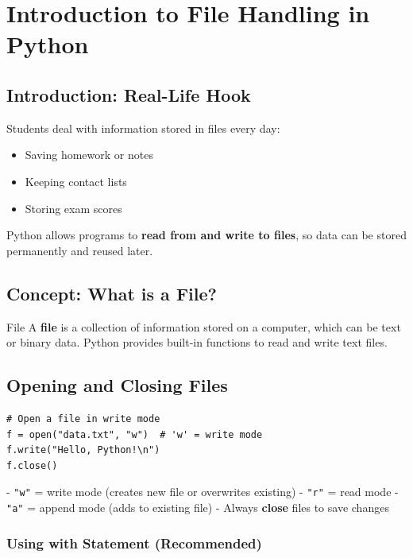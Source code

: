 \chapter{Introduction to File Handling in Python}

\section{Introduction: Real-Life Hook}

Students deal with information stored in files every day:  

\begin{itemize}
    \item Saving homework or notes  
    \item Keeping contact lists  
    \item Storing exam scores  
\end{itemize}

Python allows programs to \textbf{read from and write to files}, so data can be stored permanently and reused later.

\section{Concept: What is a File?}

\begin{definition}{File}
A \textbf{file} is a collection of information stored on a computer, which can be text or binary data.  
Python provides built-in functions to read and write text files.
\end{definition}

\section{Opening and Closing Files}

\begin{verbatim}
# Open a file in write mode
f = open("data.txt", "w")  # 'w' = write mode
f.write("Hello, Python!\n")
f.close()
\end{verbatim}

- \texttt{"w"} = write mode (creates new file or overwrites existing)  
- \texttt{"r"} = read mode  
- \texttt{"a"} = append mode (adds to existing file)  
- Always \textbf{close} files to save changes  

\subsection{Using with Statement (Recommended)}

